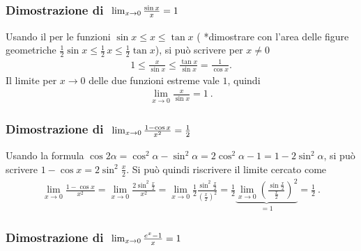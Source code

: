 \documentclass[letterpaper,10pt,italian]{jupyterBook}
\begin{document}
\subsubsection*{Dimostrazione di \protect\(\ \lim_{x \rightarrow 0} \frac{\sin x}{x} = 1 \protect\)}

\sphinxAtStartPar
Usando il {\hyperref[\detokenize{ch/infinitesimal_calculus/analysis:infinitesimal-calculus-limits-thms-comparison}]{}} per le funzioni \(\sin x \le x \le \tan x\) ( *dimostrare con l’area delle figure geometriche \(\frac{1}{2}\sin x \le \frac{1}{2} \, x \le \frac{1}{2} \tan x\)), si può scrivere per \(x \ne 0\)
\begin{equation*}
\begin{split}1 \le \frac{x}{\sin x} \le \frac{\tan x}{\sin x} = \frac{1}{\cos x} .\end{split}
\end{equation*}
\sphinxAtStartPar
Il limite per \(x \rightarrow 0\) delle due funzioni estreme vale \(1\), quindi
\begin{equation*}
\begin{split}\lim_{x \rightarrow 0} \frac{x}{\sin x} = 1 \ .\end{split}
\end{equation*}\subsubsection*{Dimostrazione di \protect\(\ \lim_{x \rightarrow 0} \frac{1 - \cos x}{x^2} = \frac{1}{2} \protect\)}

\sphinxAtStartPar
Usando la formula \(\cos 2 \alpha = \cos^2 \alpha - \sin^2 \alpha = 2 \cos^2 \alpha - 1 = 1 - 2 \sin^2 \alpha\), si può scrivere \(1 - \cos x = 2 \sin^2 \frac{x}{2}\). Si può quindi riscrivere il limite cercato come
\begin{equation*}
\begin{split}\lim_{x \rightarrow 0} \frac{1 - \cos x}{x^2} = \lim_{x \rightarrow 0} \frac{ 2 \sin^2 \frac{x}{2} }{x^2} = \lim_{x \rightarrow 0} \frac{1}{2} \frac{\sin^2 \frac{x}{2}}{\left( \frac{x}{2} \right)^2} = \frac{1}{2} \underbrace{\lim_{x \rightarrow 0} \left( \frac{\sin \frac{x}{2}}{\frac{x}{2}} \right)^2}_{=1} = \frac{1}{2} \ .\end{split}
\end{equation*}\subsubsection*{Dimostrazione di \protect\(\ \lim_{x \rightarrow 0} \frac{e^x - 1}{x}= 1 \protect\)}
\end{document}
